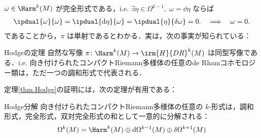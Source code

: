 \documentclass[geometry_main]{subfiles}
\begin{document}
$\omega \in \Harm^k(M)$ が完全形式である，i.e. $\exists \eta \in \Omega^{k-1},\; \omega = \dd{\eta}$ ならば
\begin{align} 
	\ipdual{\omega}{\omega} = \ipdual{\dd{\eta}}{\omega} = \ipdual{\eta}{\delta\omega} = 0.\quad \Longrightarrow \quad \omega = 0.
\end{align}
であることから，$\pi$ は単射であるとわかる．実は，次の事実が知られている：

\begin{mytheo}[label=thm.Hodge]{Hodgeの定理} 
	自然な写像 $\pi \colon \Harm^k(M) \to \irm{H}{DR}^k(M)$ は同型写像である．i.e. 向き付けられたコンパクトRiemann多様体の任意のde Rhamコホモロジー類は，ただ一つの調和形式で代表される．
\end{mytheo}

定理\ref{thm.Hodge}の証明には，次の定理が有用である：

\begin{mytheo}[label=thm.Hodge_decomp]{Hodge分解}
	向き付けられたコンパクトRiemann多様体の任意の $k$-形式は，調和形式，完全形式，双対完全形式の和として一意的に分解される：
	\begin{align} 
		\Omega^k(M) = \Harm^k(M) \oplus \dd{\Omega^{k-1}(M)} \oplus \delta \Omega^{k+1}(M)
	\end{align}
\end{mytheo}
\end{document}
